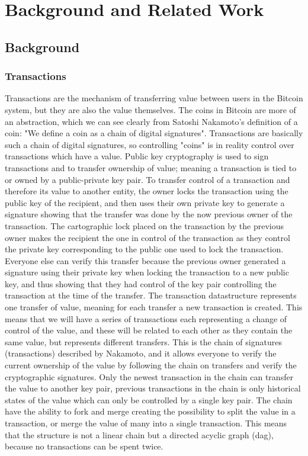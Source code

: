 \chapter{Background and Related Work}
\label{chap:related}

\section{Background}
\label{sec:background}

\subsection{Transactions}
\label{subsec:transactions}

Transactions are the mechanism of transferring value between users in the Bitcoin system, but they are also the value themselves.
The coins in Bitcoin are more of an abstraction, which we can see clearly from Satoshi Nakamoto's definition of a coin: "We define a coin as a chain of digital signatures"\cite{nakamoto2008bitcoin}.
Transactions are basically such a chain of digital signatures, so controlling "coins" is in reality control over transactions which have a value.
Public key cryptography is used to sign transactions and to transfer ownership of value; meaning a transaction is tied to or owned by a public-private key pair.
To transfer control of a transaction and therefore its value to another entity, the owner locks the transaction using the public key of the recipient, and then uses their own private key to generate a signature showing that the transfer was done by the now previous owner of the transaction. The cartographic lock placed on the transaction by the previous owner makes the recipient the one in control of the transaction as they control the private key corresponding to the public one used to lock the transaction. Everyone else  can verify this transfer because the previous owner generated a signature using their private key when locking the transaction to a new public key, and thus showing that they had control of the key pair controlling the transaction at the time of the transfer. The transaction datastructure represents one transfer of value, meaning for each transfer a new transaction is created. This means that we will have a series of transactions each representing a change of control of the value, and these will be related to each other as they contain the same value, but represents different transfers. This is the chain of signatures (transactions) described by Nakamoto, and it allows everyone to verify the current ownership of the value by following the chain on transfers and verify the cryptographic signatures. Only the newest transaction in the chain can transfer the value to another key pair, previous transactions in the chain is only historical states of the value which can only be controlled by a single key pair. The chain have the ability to fork and merge creating the possibility to split the value in a transaction, or merge the value of many into a single transaction. This means that the structure is not a linear chain but a directed acyclic graph (dag), because no transactions can be spent twice.
